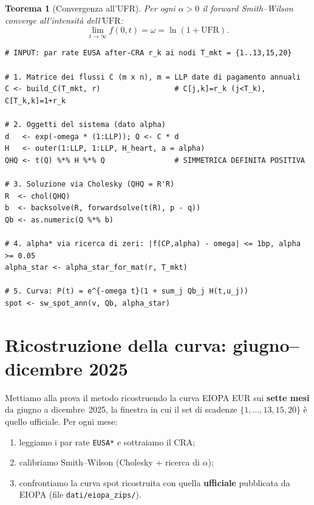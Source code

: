 \documentclass[11pt,a4paper]{article}
\theoremstyle{plain}
\newtheorem{teorema}{Teorema}[section]
\theoremstyle{definition}
\theoremstyle{remark}
\newcommand{\UFR}{\ensuremath{\mathrm{UFR}}}
\newcommand{\CRA}{\ensuremath{\mathrm{CRA}}}
\begin{document}
\begin{teorema}[Convergenza all'UFR]
\label{thm:convergenza}
Per ogni $\alpha>0$ il forward Smith--Wilson converge all'intensit\`a dell'$\UFR$:
\[
  \lim_{t\to\infty} f(0,t) = \omega = \ln(1+\UFR).
\]
\end{teorema}

\begin{algobox}
\begin{Verbatim}[fontsize=\small]
# INPUT: par rate EUSA after-CRA r_k ai nodi T_mkt = {1..13,15,20}

# 1. Matrice dei flussi C (m x n), m = LLP date di pagamento annuali
C <- build_C(T_mkt, r)                 # C[j,k]=r_k (j<T_k), C[T_k,k]=1+r_k

# 2. Oggetti del sistema (dato alpha)
d   <- exp(-omega * (1:LLP)); Q <- C * d
H   <- outer(1:LLP, 1:LLP, H_heart, a = alpha)
QHQ <- t(Q) %*% H %*% Q                # SIMMETRICA DEFINITA POSITIVA

# 3. Soluzione via Cholesky (QHQ = R'R)
R  <- chol(QHQ)
b  <- backsolve(R, forwardsolve(t(R), p - q))
Qb <- as.numeric(Q %*% b)

# 4. alpha* via ricerca di zeri: |f(CP,alpha) - omega| <= 1bp, alpha >= 0.05
alpha_star <- alpha_star_for_mat(r, T_mkt)

# 5. Curva: P(t) = e^{-omega t}(1 + sum_j Qb_j H(t,u_j))
spot <- sw_spot_ann(v, Qb, alpha_star)
\end{Verbatim}
\end{algobox}

\section{Ricostruzione della curva: giugno--dicembre 2025}
\label{sec:ricostruzione}

Mettiamo alla prova il metodo ricostruendo la curva EIOPA EUR sui \textbf{sette mesi} da
giugno a dicembre~2025, la finestra in cui il set di scadenze $\{1,\dots,13,15,20\}$ \`e quello
ufficiale. Per ogni mese:
\begin{enumerate}
  \item leggiamo i par rate \texttt{EUSA*} e sottraiamo il $\CRA$;
  \item calibriamo Smith--Wilson (Cholesky + ricerca di $\alpha$);
  \item confrontiamo la curva spot ricostruita con quella \textbf{ufficiale} pubblicata da
        EIOPA (file \texttt{dati/eiopa\_zips/}).
\end{enumerate}
\end{document}
